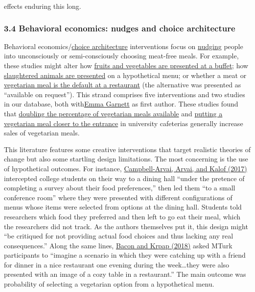 \documentclass[
  letterpaper,
  DIV=11,
  numbers=noendperiod]{scrartcl}
\begin{document}
effects enduring this long.

\hypertarget{behavioral-economics-nudges-and-choice-architecture}{%
\subsubsection{3.4 Behavioral economics: nudges and choice
architecture}\label{behavioral-economics-nudges-and-choice-architecture}}

Behavioral
economics/\href{https://thedecisionlab.com/reference-guide/psychology/choice-architecture}{choice
architecture} interventions focus on
\href{https://yalebooks.yale.edu/book/9780300262285/nudge/}{nudging}
people into unconsciously or semi-consciously choosing meat-free meals.
For example, these studies might alter how
\href{https://www.sciencedirect.com/science/article/abs/pii/S0950329315300227?via\%3Dihub}{fruits
and vegetables are presented at a buffet}; how
\href{https://doi.org/10.1016/j.appet.2016.07.009}{slaughtered animals
are presented} on a hypothetical menu; or whether a meat or
\href{https://doi.org/10.1017/bpp.2019.11}{vegetarian meal is the
default at a restaurant} (the alternative was presented as ``available
on request''). This strand comprises five interventions and two studies
in our database, both
with\href{https://www.phc.ox.ac.uk/team/emma-garnett}{Emma Garnett} as
first author. These studies found that
\href{https://doi.org/10.1073/pnas.1907207116}{doubling the percentage
of vegetarian meals available} and
\href{https://doi.org/10.1038/s43016-020-0132-8}{putting a vegetarian
meal closer to the entrance} in university cafeterias generally increase
sales of vegetarian meals.

This literature features some creative interventions that target
realistic theories of change but also some startling design limitations.
The most concerning is the use of hypothetical outcomes. For instance,
\href{https://journals.sagepub.com/doi/10.1177/0013916512469099}{Campbell-Arvai,
Arvai, and Kalof (2017)} intercepted college students on their way to a
dining hall ``under the pretence of completing a survey about their food
preferences,'' then led them ``to a small conference room'' where they
were presented with different configurations of menus whose items were
selected from options at the dining hall. Students told researchers
which food they preferred and then left to go eat their meal, which the
researchers did not track. As the authors themselves put it, this design
might ``be critiqued for not providing actual food choices and thus
lacking any real consequences.'' Along the same lines,
\href{https://www.sciencedirect.com/science/article/abs/pii/S0195666317309480?via\%3Dihub}{Bacon
and Krpap (2018)} asked MTurk participants to ``imagine a scenario in
which they were catching up with a friend for dinner in a nice
restaurant one evening during the week\ldots they were also presented
with an image of a cozy table in a restaurant.'' The main outcome was
probability of selecting a vegetarian option from a hypothetical menu.
\end{document}
